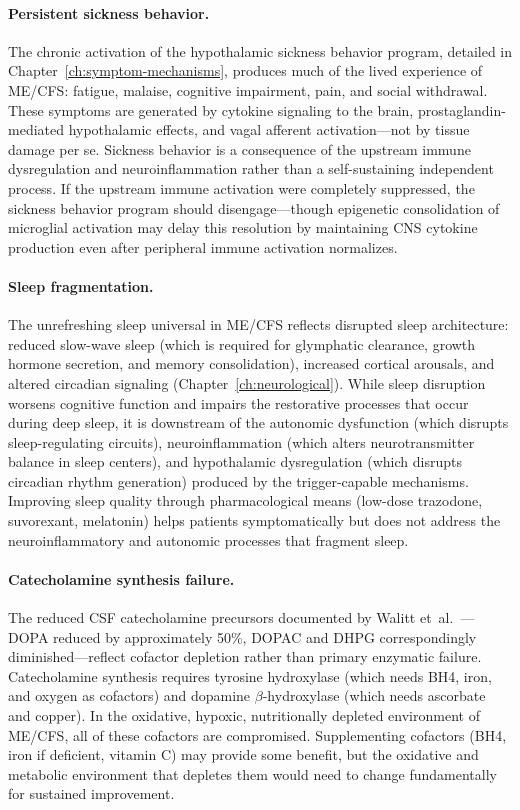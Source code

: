 \paragraph{Persistent sickness behavior.} The chronic activation of the hypothalamic sickness behavior program, detailed in Chapter~\ref{ch:symptom-mechanisms}, produces much of the lived experience of ME/CFS: fatigue, malaise, cognitive impairment, pain, and social withdrawal. These symptoms are generated by cytokine signaling to the brain, prostaglandin-mediated hypothalamic effects, and vagal afferent activation---not by tissue damage per se. Sickness behavior is a consequence of the upstream immune dysregulation and neuroinflammation rather than a self-sustaining independent process. If the upstream immune activation were completely suppressed, the sickness behavior program should disengage---though epigenetic consolidation of microglial activation may delay this resolution by maintaining CNS cytokine production even after peripheral immune activation normalizes.

\paragraph{Sleep fragmentation.} The unrefreshing sleep universal in ME/CFS reflects disrupted sleep architecture: reduced slow-wave sleep (which is required for glymphatic clearance, growth hormone secretion, and memory consolidation), increased cortical arousals, and altered circadian signaling (Chapter~\ref{ch:neurological}). While sleep disruption worsens cognitive function and impairs the restorative processes that occur during deep sleep, it is downstream of the autonomic dysfunction (which disrupts sleep-regulating circuits), neuroinflammation (which alters neurotransmitter balance in sleep centers), and hypothalamic dysregulation (which disrupts circadian rhythm generation) produced by the trigger-capable mechanisms. Improving sleep quality through pharmacological means (low-dose trazodone, suvorexant, melatonin) helps patients symptomatically but does not address the neuroinflammatory and autonomic processes that fragment sleep.

\paragraph{Catecholamine synthesis failure.} The reduced CSF catecholamine precursors documented by Walitt et~al.~\cite{Walitt2024NIH}---DOPA reduced by approximately 50\%, DOPAC and DHPG correspondingly diminished---reflect cofactor depletion rather than primary enzymatic failure. Catecholamine synthesis requires tyrosine hydroxylase (which needs BH4, iron, and oxygen as cofactors) and dopamine $\beta$-hydroxylase (which needs ascorbate and copper). In the oxidative, hypoxic, nutritionally depleted environment of ME/CFS, all of these cofactors are compromised. Supplementing cofactors (BH4, iron if deficient, vitamin C) may provide some benefit, but the oxidative and metabolic environment that depletes them would need to change fundamentally for sustained improvement.

